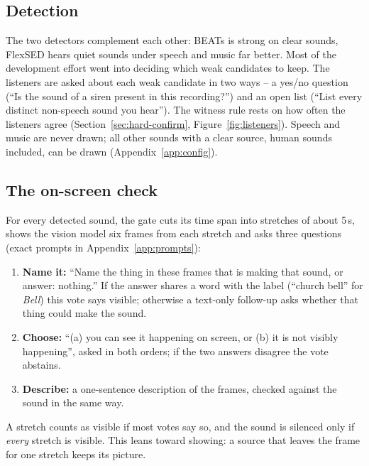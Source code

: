 \subsection{Detection}
The two detectors complement each other: BEATs is strong on clear sounds, FlexSED hears quiet sounds under speech and
music far better. Most of the development effort went into deciding which weak candidates to keep. The listeners are
asked about each weak candidate in two ways -- a yes/no question (``Is the sound of a siren present in this
recording?'') and an open list (``List every distinct non-speech sound you hear''). The witness rule rests on how often the listeners agree (Section~\ref{sec:hard-confirm}, Figure~\ref{fig:listeners}). Speech and music are never drawn; all other sounds with a clear source,
human sounds included, can be drawn (Appendix~\ref{app:config}).

\subsection{The on-screen check}\label{sec:gate}
For every detected sound, the gate cuts its time span into stretches of about 5\,s, shows the vision model six frames
from each stretch and asks three questions (exact prompts in Appendix~\ref{app:prompts}):
\begin{enumerate}
  \item \textbf{Name it:} ``Name the thing in these frames that is making that sound, or answer: nothing.'' If the
        answer shares a word with the label (``church bell'' for \emph{Bell}) this vote says visible; otherwise a
        text-only follow-up asks whether that thing could make the sound.
  \item \textbf{Choose:} ``(a) you can see it happening on screen, or (b) it is not visibly happening'', asked in both
        orders; if the two answers disagree the vote abstains.
  \item \textbf{Describe:} a one-sentence description of the frames, checked against the sound in the same way.
\end{enumerate}
A stretch counts as visible if most votes say so, and the sound is silenced only if \emph{every} stretch is visible.
This leans toward showing: a source that leaves the frame for one stretch keeps its picture.


